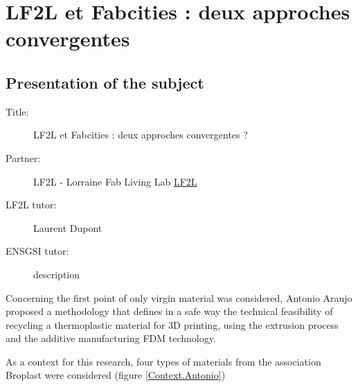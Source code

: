

\chapter{LF2L et Fabcities : deux approches convergentes}


\section{Presentation of the subject}


\begin{description}
	\item[Title:] LF2L et Fabcities : deux approches convergentes ?  
	\item[Partner:] LF2L 	- Lorraine Fab Living Lab \href{http://www.lf2l.fr}{LF2L}			

	\item[LF2L tutor:] Laurent Dupont 
	\item[ENSGSI tutor:] description
\end{description}

Concerning the first point of only virgin material was considered, Antonio Araujo proposed a methodology that defines in a safe way the technical feasibility of recycling a thermoplastic material for 3D printing, using the extrusion process and the additive manufacturing FDM technology.

As a context for this research, four types of materials from the association Broplast were considered (figure \ref{Context.Antonio})




%	
%
%	
